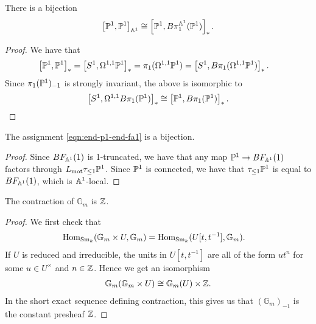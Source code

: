 \documentclass[11pt,openany]{book}
\begin{document}
\begin{proposition} There is a bijection
\begin{align*}
    \left[ \P^1,\P^1 \right]_{\A^1} \cong \left[ \P^1, B\pi_1^{\A^1}(\P^1) \right]_\ast.
\end{align*}
\end{proposition}
\begin{proof} We have that
\begin{align*}
     \left[ \P^1,\P^1 \right]_\ast &= \left[ S^1, \Omega^{1,1} \P^1 \right]_\ast = \pi_1(\Omega^{1,1}\P^1) = \left[ S^1, B\pi_1(\Omega^{1,1} \P^1) \right]_\ast.
\end{align*}
Since $\pi_1(\P^1)_{-1}$ is strongly invariant, the above is isomorphic to
\begin{align*}
    \left[ S^1, \Omega^{1,1} B\pi_1(\P^1) \right]_\ast \cong \left[ \P^1, B \pi_1(\P^1) \right]_\ast.
\end{align*}
\end{proof}


\begin{corollary} The assignment \autoref{eqn:end-p1-end-fa1} is a bijection.
\end{corollary}
\begin{proof} Since $BF_{\A^1}(1)$ is 1-truncated, we have that any map $\P^1 \to BF_{\A^1}(1)$ factors through $L_\mot \tau_{\le 1} \P^1$. Since $\P^1$ is connected, we have that $\tau_{\le 1} \P^1$ is equal to $BF_{\A^1}(1)$, which is $\A^1$-local.
\end{proof}

\begin{proposition} The contraction of $\mathbb{G}_m$ is $\Z$.
\end{proposition}
\begin{proof} We first check that
\begin{align*}
    \Hom_{\Sm_k}(\mathbb{G}_m \times U, \mathbb{G}_m) &= \Hom_{\Sm_k}(U[t,t^{-1}],\mathbb{G}_m).
\end{align*}
If $U$ is reduced and irreducible, the units in $U[t,t^{-1}]$ are all of the form $u t^n$ for some $u \in U^\times$ and $n\in \Z$. Hence we get an isomorphism
\begin{align*}
    \mathbb{G}_m(\mathbb{G}_m \times U) \cong \mathbb{G}_m(U) \times \Z.
\end{align*}
In the short exact sequence defining contraction, this gives us that $(\mathbb{G}_m)_{-1}$ is the constant presheaf $\Z$.
\end{proof}
\end{document}
